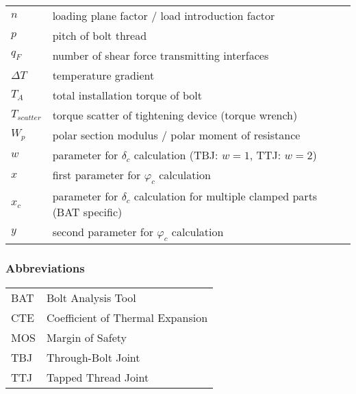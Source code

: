 \begin{longtable}{p{2cm} l}
  $n$ & loading plane factor / load introduction factor \\
  $p$ & pitch of bolt thread \\
  $q_F$ & number of shear force transmitting interfaces \\
  $\Delta T$ & temperature gradient \\
  $T_A$ & total installation torque of bolt \\
  $T_{scatter}$ & torque scatter of tightening device (torque wrench) \\
  $W_p$ & polar section modulus / polar moment of resistance \\
  $w$ & parameter for $\delta_c$ calculation (TBJ: $w=1$, TTJ: $w=2$) \\
  $x$ & first parameter for $\varphi_c$ calculation \\
  $x_c$ & parameter for $\delta_c$ calculation for multiple clamped parts (BAT specific) \\
  $y$ & second parameter for $\varphi_c$ calculation \\
\end{longtable}

\subsubsection*{Abbreviations}
\begin{tabular}{p{3cm} l}
  BAT & Bolt Analysis Tool \\
  CTE & Coefficient of Thermal Expansion \\
  MOS & Margin of Safety \\
  TBJ & Through-Bolt Joint \\
  TTJ & Tapped Thread Joint \\
\end{tabular}